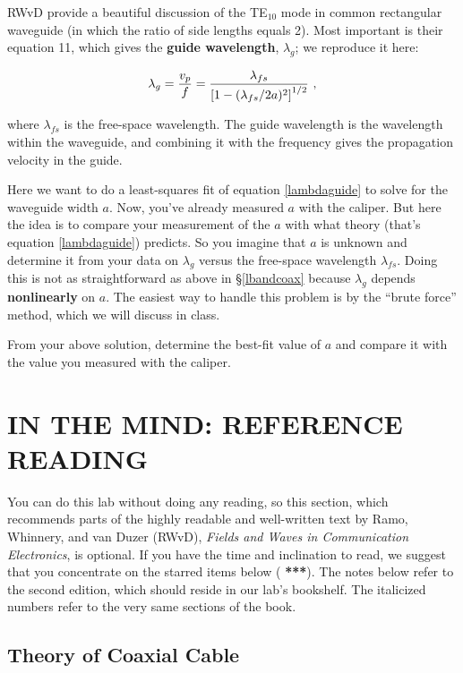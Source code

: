 \documentclass[11pt,preprint]{aastex}
\begin{document}
	RWvD provide a beautiful discussion of the TE$_{10}$ mode in
common rectangular waveguide (in which the ratio of side lengths equals
2).  Most important is their equation 11, which gives the {\bf guide
wavelength}, $\lambda_g$; we reproduce it here:

\begin{equation} \label{lambdaguide}
\lambda_g = {v_p \over f} = {\lambda_{fs} \over \left[ 1 - (\lambda_{fs}/2a)^2
\right]^{1/2} } \ ,
\end{equation}

\noindent where $\lambda_{fs}$ is the free-space wavelength.  The guide
wavelength is the wavelength within the waveguide, and combining it with
the frequency gives the propagation velocity in the guide. 

Here we want to do a least-squares fit of equation \ref{lambdaguide} to
solve for the waveguide width $a$. Now, you've already measured $a$ with
the caliper. But here the idea is to compare your measurement of the
$a$ with what theory (that's equation \ref{lambdaguide})
predicts. So you imagine that $a$ is unknown and determine it from your
data on $\lambda_g$ versus the free-space wavelength $\lambda_{fs}$.
Doing this is not as straightforward as above in \S \ref{lbandcoax}
because $\lambda_g$ depends {\bf nonlinearly} on $a$. The easiest way to
handle
this problem is by the ``brute force'' method, which we will discuss in
class. 

	From your above solution, determine the best-fit value of $a$
and compare it with the value you measured with the caliper.

\section {IN THE MIND: REFERENCE READING} \label{RWvD}

You can do this lab without doing any reading, so this section, which
recommends parts of the highly readable and well-written text by Ramo,
Whinnery, and van Duzer (RWvD), {\it Fields and Waves in Communication
  Electronics}, is optional. If you have the time and inclination to
read, we suggest that you concentrate on the starred items below ({\bf
  ***}).  The notes below refer to the second edition, which should
reside in our lab's bookshelf. The italicized numbers refer to the very
same sections of the book.

\subsection{ Theory of Coaxial Cable}
	
\end{document}
